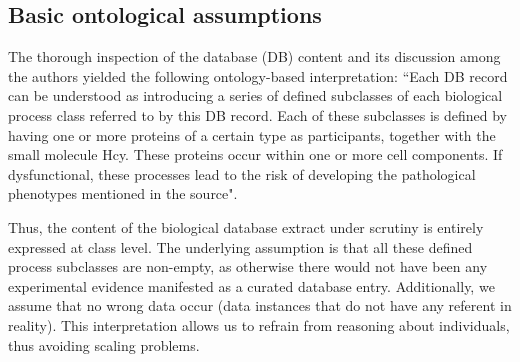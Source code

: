 

\subsection*{Basic ontological assumptions}
The thorough inspection of the database (DB) content and its discussion among the authors yielded the following ontology-based interpretation: ``Each DB record can be understood as introducing a series of defined subclasses of each biological process class referred to by this DB record. Each of these subclasses is defined by having one or more proteins of a certain type as participants, together with the small molecule Hcy. These proteins occur within one or more cell components. If dysfunctional, these processes lead to the risk of developing the pathological phenotypes mentioned in the source".

Thus, the content of the biological database extract under scrutiny is entirely expressed at class level. The underlying assumption is that all these defined process subclasses are non-empty, as otherwise there would not have been any experimental evidence manifested as a curated database entry. Additionally, we assume that no wrong data occur (data instances that do not have any referent in reality). This interpretation allows us to refrain from reasoning about individuals, thus avoiding scaling problems.  

%
%

